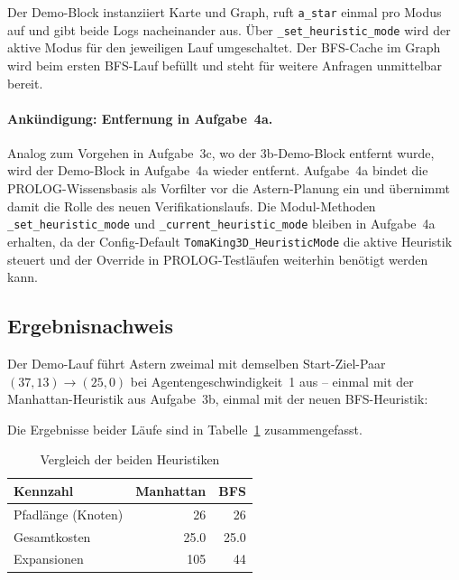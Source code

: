 

Der Demo-Block instanziiert Karte und Graph, ruft \texttt{a\_star} einmal pro Modus auf und gibt beide Logs nacheinander aus. Über \texttt{\_set\_heuristic\_mode} wird der aktive Modus für den jeweiligen Lauf umgeschaltet. Der \acs{BFS}-Cache im Graph wird beim ersten \acs{BFS}-Lauf befüllt und steht für weitere Anfragen unmittelbar bereit.

\paragraph{Ankündigung: Entfernung in Aufgabe~4a.}
Analog zum Vorgehen in Aufgabe~3c, wo der 3b-Demo-Block entfernt wurde, wird der Demo-Block in Aufgabe~4a wieder entfernt. Aufgabe~4a bindet die \acs{PROLOG}-Wissensbasis als Vorfilter vor die \acs{Astern}-Planung ein und übernimmt damit die Rolle des neuen Verifikationslaufs. Die Modul-Methoden \texttt{\_set\_heuristic\_mode} und \texttt{\_current\_heuristic\_mode} bleiben in Aufgabe~4a erhalten, da der Config-Default \texttt{TomaKing3D\_HeuristicMode} die aktive Heuristik steuert und der Override in \acs{PROLOG}-Testläufen weiterhin benötigt werden kann.


\subsection{Ergebnisnachweis}
\label{sssec:heuristik_3d_nachweis}

Der Demo-Lauf führt \acs{Astern} zweimal mit demselben Start-Ziel-Paar \((37, 13) \to (25, 0)\) bei Agentengeschwindigkeit~1 aus -- einmal mit der Manhattan-Heuristik aus Aufgabe~3b, einmal mit der neuen \acs{BFS}-Heuristik:



Die Ergebnisse beider Läufe sind in Tabelle~\ref{tab:heuristik_3d} zusammengefasst.

\begin{table}[H]
    \centering
    \begin{tabular}{l r r}
        \toprule
        \textbf{Kennzahl} & \textbf{Manhattan} & \textbf{BFS} \\
        \midrule
        Pfadlänge (Knoten) & 26  & 26  \\
        Gesamtkosten       & 25.0 & 25.0 \\
        Expansionen        & 105 & 44 \\
        \bottomrule
    \end{tabular}
    \caption{Vergleich der beiden Heuristiken}
    \label{tab:heuristik_3d}
\end{table}

